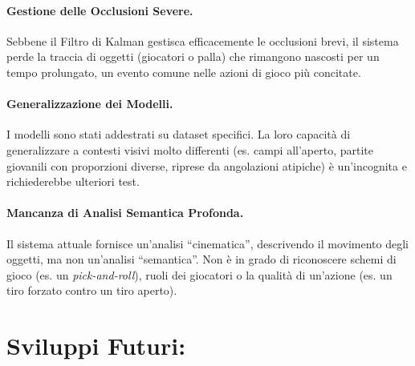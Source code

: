 \documentclass[12pt,a4paper,openright,twoside]{book}
\begin{document}
\paragraph{Gestione delle Occlusioni Severe.} Sebbene il Filtro 
di Kalman gestisca efficacemente le occlusioni brevi, il sistema 
perde la traccia di oggetti (giocatori o palla) che rimangono 
nascosti per un tempo prolungato, un evento comune nelle azioni 
di gioco più concitate.

\paragraph{Generalizzazione dei Modelli.} I modelli sono stati
addestrati su dataset specifici. La loro capacità di generalizzare 
a contesti visivi molto differenti (es. campi all'aperto, partite 
giovanili con proporzioni diverse, riprese da angolazioni atipiche) 
è un'incognita e richiederebbe ulteriori test.

\paragraph{Mancanza di Analisi Semantica Profonda.} Il sistema 
attuale fornisce un'analisi ``cinematica'', descrivendo il movimento degli
oggetti, ma non un'analisi ``semantica''. Non è in grado di riconoscere 
schemi di gioco (es. un \emph{pick-and-roll}), ruoli dei giocatori o la qualità 
di un'azione (es. un tiro forzato contro un tiro aperto).

\section{Sviluppi Futuri:}
\label{sec:sviluppati-futuri}
\end{document}
